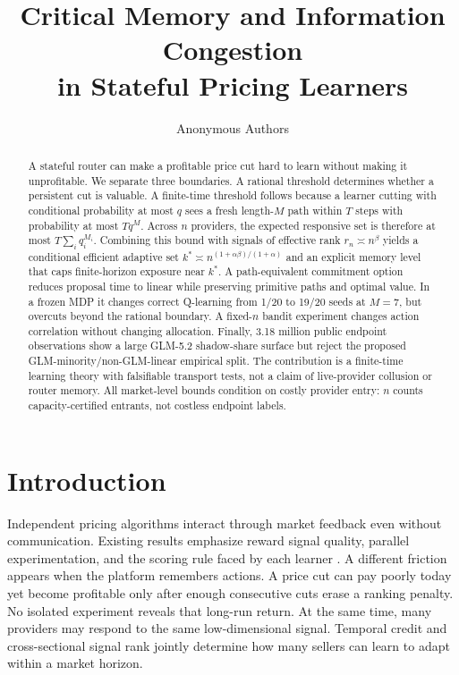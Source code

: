 \documentclass[10pt,twocolumn]{article}
\title{Critical Memory and Information Congestion\\
in Stateful Pricing Learners}
\author{Anonymous Authors}
\date{}
\begin{document}
\maketitle

\begin{abstract}
A stateful router can make a profitable price cut hard to learn without making
it unprofitable.  We separate three boundaries.  A rational threshold determines
whether a persistent cut is valuable.  A finite-time threshold follows because
a learner cutting with conditional probability at most $q$ sees a fresh
length-$M$ path within $T$ steps with probability at most $Tq^M$.  Across $n$
providers, the expected responsive set is therefore at most
$T\sum_i q_i^{M_i}$.  Combining this bound with signals of effective rank
$r_n\asymp n^\beta$ yields a conditional efficient adaptive set
$k^*\asymp n^{(1+\alpha\beta)/(1+\alpha)}$ and an explicit memory level that
caps finite-horizon exposure near $k^*$.  A path-equivalent commitment option
reduces proposal time to linear while preserving primitive paths and optimal
value.  In a frozen MDP it changes correct Q-learning from 1/20 to 19/20 seeds
at $M=7$, but overcuts beyond the rational boundary.  A fixed-$n$ bandit
experiment changes action correlation without changing allocation.  Finally,
3.18 million public endpoint observations show a large GLM-5.2 shadow-share
surface but reject the proposed GLM-minority/non-GLM-linear empirical split.
The contribution is a finite-time learning theory with falsifiable transport
tests, not a claim of live-provider collusion or router memory.
All market-level bounds condition on costly provider entry: $n$ counts
capacity-certified entrants, not costless endpoint labels.
\end{abstract}

\section{Introduction}

Independent pricing algorithms interact through market feedback even without
communication.  Existing results emphasize reward signal quality, parallel
experimentation, and the scoring rule faced by each learner
\citep{hansen2021,calvano2020}.  A different friction appears when the platform
remembers actions.  A price cut can pay poorly today yet become profitable only
after enough consecutive cuts erase a ranking penalty.  No isolated experiment
reveals that long-run return.  At the same time, many providers may respond to
the same low-dimensional signal.  Temporal credit and cross-sectional signal
rank jointly determine how many sellers can learn to adapt within a market
horizon.
\end{document}
